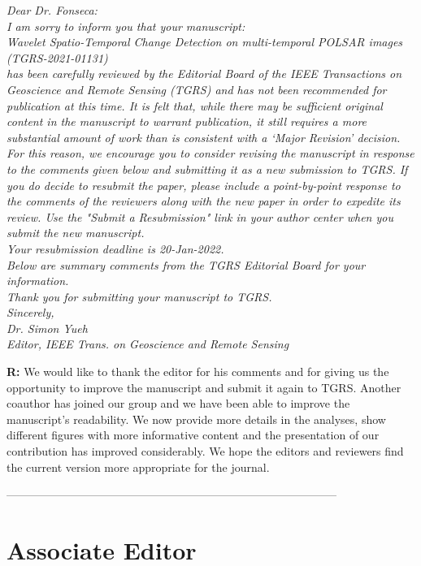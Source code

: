 \documentclass[11pt]{report}
\begin{document}
\textit{
Dear Dr. Fonseca:\\
I am sorry to inform you that your manuscript:\\
Wavelet Spatio-Temporal Change Detection on multi-temporal POLSAR images (TGRS-2021-01131)\\
has been carefully reviewed by the Editorial Board of the IEEE Transactions on Geoscience and Remote Sensing
(TGRS) and has not been recommended for publication at this time. It is felt that, while there may be sufficient original
content in the manuscript to warrant publication, it still requires a more substantial amount of work than is consistent with
a ‘Major Revision’ decision. For this reason, we encourage you to consider revising the manuscript in response to the
comments given below and submitting it as a new submission to TGRS. If you do decide to resubmit the paper, please
include a point-by-point response to the comments of the reviewers along with the new paper in order to expedite its
review. Use the "Submit a Resubmission" link in your author center when you submit the new manuscript.\\
Your resubmission deadline is 20-Jan-2022.\\
Below are summary comments from the TGRS Editorial Board for your information.\\
Thank you for submitting your manuscript to TGRS.\\
Sincerely,\\
Dr. Simon Yueh\\
Editor, IEEE Trans. on Geoscience and Remote Sensing
}

\medskip

\textbf{R:} We would like to thank the editor for his comments and for giving us the opportunity to improve the manuscript and submit it again to TGRS. Another coauthor has joined our group and we have been able to improve the manuscript's readability. We now provide more details in the analyses, show different figures with more informative content and the presentation of our contribution has improved considerably. We hope the editors and reviewers find the current version more appropriate for the journal.

\noindent---------------------------------------------------------------------------------------
\section*{Associate Editor}
\end{document}
